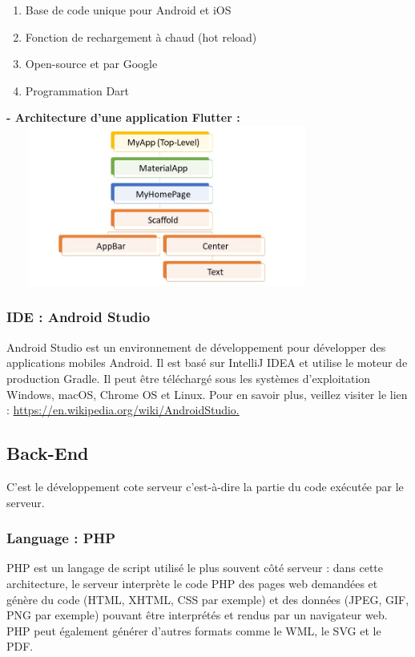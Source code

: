 \begin{enumerate}
	\item Base de code unique pour Android et iOS
	\item Fonction de rechargement à chaud (hot reload)
	\item Open-source et par Google
	\item Programmation Dart \newline \newline \newline
\end{enumerate}

\textbf {- Architecture d’une application Flutter :}\newline \newline \newline
\includegraphics[width=400px,height=200px]{./Template LaTeX/Images/Flutter_architect.png}
\subsubsection{IDE : Android Studio}
Android Studio est un environnement de développement pour développer des applications mobiles Android. Il est basé sur IntelliJ IDEA et utilise le moteur de production Gradle. Il peut être téléchargé sous les systèmes d'exploitation Windows, macOS, Chrome OS et Linux.
\newline Pour en savoir plus, veillez
visiter le lien : \href{https://en.wikipedia.org/wiki/AndroidStudio.}{https://en.wikipedia.org/wiki/AndroidStudio.}
\subsection{Back-End}
C’est le développement cote serveur c’est-à-dire la partie du code exécutée par le serveur.
\subsubsection{Language : PHP}
PHP est un langage de script utilisé le plus souvent côté serveur : dans cette architecture, le serveur interprète le code PHP des pages web demandées et génère du code (HTML, XHTML, CSS par exemple) et des données (JPEG, GIF, PNG par exemple) pouvant être interprétés et rendus par un navigateur web. PHP peut également générer d'autres formats comme le WML, le SVG et le PDF.

